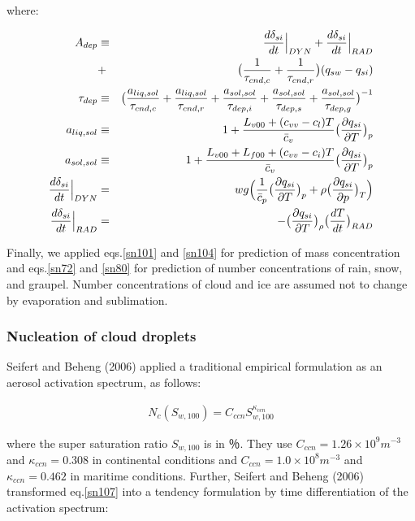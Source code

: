 where:

\begin{eqnarray}
A_{dep}&\equiv&\frac{d\delta_{si}}{dt}\Bigr|_{DYN}+\frac{d\delta_{si}}{dt}\Bigr|_{RAD}\nonumber\\
&+&\bigl(\frac{1}{\tau_{cnd,c}}+\frac{1}{\tau_{cnd,r}}\bigr)(q_{sw}-q_{si})\label{sn105}\\
\tau_{dep}&\equiv&\bigl(\frac{a_{liq,sol}}{\tau_{cnd,c}}+\frac{a_{liq,sol}}{\tau_{cnd,r}}+\frac{a_{sol,sol}}{\tau_{dep,i}}+\frac{a_{sol,sol}}{\tau_{dep,s}}+\frac{a_{sol,sol}}{\tau_{dep,g}}\bigr)^{-1}\label{sn106}\\
a_{liq,sol}&\equiv&1+\frac{L_{v00}+(c_{vv}-c_{l})T}{\bar{c}_{v}}\bigl(\frac{\partial q_{si}}{\partial T}\bigr)_{p}\nonumber\\
a_{sol,sol}&\equiv&1+\frac{L_{v00}+L_{f00}+(c_{vv}-c_{i})T}{\bar{c}_{v}}\bigl(\frac{\partial q_{si}}{\partial T}\bigr)_{p}\nonumber\\
\frac{d\delta_{si}}{dt}\Bigr|_{DYN}&=&wg\Bigl(\frac{1}{\bar{c}_{p}}\bigl(\frac{\partial q_{si}}{\partial T}\bigr)_{p}+\rho\bigl(\frac{\partial q_{si}}{\partial p}\bigr)_{T}\Bigr)\nonumber\\
\frac{d\delta_{si}}{dt}\Bigl|_{RAD}&=&-\bigl(\frac{\partial q_{si}}{\partial T}\bigr)_{\rho}\bigl(\frac{dT}{dt}\bigr)_{RAD}\nonumber
\end{eqnarray}

Finally, we applied eqs.\ref{sn101} and \ref{sn104} for prediction of mass concentration and eqs.\ref{sn72} and \ref{sn80} for prediction of number concentrations of rain, snow, and graupel. Number concentrations of cloud and ice are assumed not to change by evaporation and sublimation.


\subsubsection{Nucleation of cloud droplets}
Seifert and Beheng (2006) applied a traditional empirical formulation as an aerosol activation spectrum, as follows:

\begin{eqnarray}
N_{c}(S_{w,100})=C_{ccn}S_{w,100}^{\kappa_{ccn}}\label{sn107}
\end{eqnarray}

where the super saturation ratio $S_{w,100}$ is in ％. They use $C_{ccn} = 1.26 \times 10^{9} m^{-3}$ and $\kappa_{ccn} = 0.308$ in continental conditions and $C_{ccn} = 1.0 \times 10^{8} m^{-3}$ and $\kappa_{ccn} = 0.462$ in maritime conditions. Further, Seifert and Beheng (2006) transformed eq.\ref{sn107} into a tendency formulation by time differentiation of the activation spectrum:


